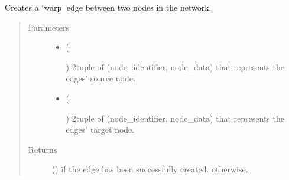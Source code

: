 \documentclass[letterpaper,10pt,english]{sphinxmanual}
\begin{document}
\begin{fulllineitems}
\begin{fulllineitems}
\label{\detokenize{cockatoo:cockatoo.KnitNetworkBase.create_warp_edge}}
Creates a ‘warp’ edge between two nodes in the network.
\begin{quote}\begin{description}
\item[{Parameters}] \leavevmode\begin{itemize}
\item {} 
 (%
\begin{footnote}[79]\sphinxAtStartFootnote
{}
%
\end{footnote}) \textendash{} 2\sphinxhyphen{}tuple of (node\_identifier, node\_data) that represents the edges’
source node.

\item {} 
 (%
\begin{footnote}[80]\sphinxAtStartFootnote
{}
%
\end{footnote}) \textendash{} 2\sphinxhyphen{}tuple of (node\_identifier, node\_data) that represents the edges’
target node.

\end{itemize}

\item[{Returns}] \leavevmode
{} () \textendash{}  if the edge has been successfully created.
 otherwise.

\end{description}\end{quote}

\end{fulllineitems}



\end{fulllineitems}
\end{document}
